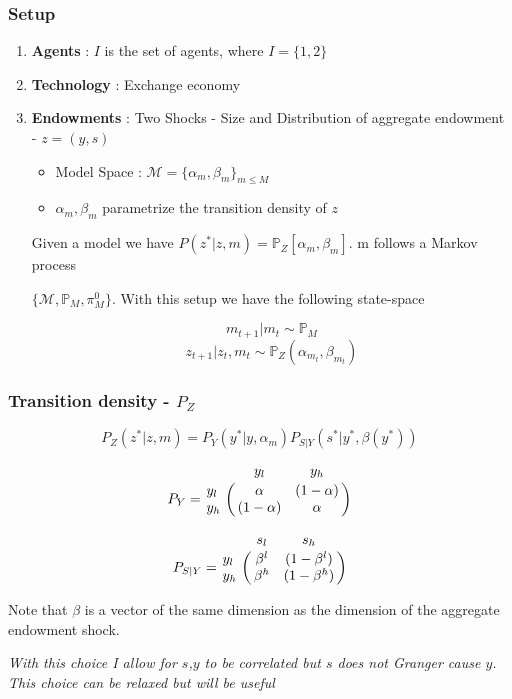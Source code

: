 \documentclass{beamer}
\theoremstyle{definition}
\begin{document}
\begin{frame}
\frametitle{Setup}
	\begin{enumerate}
		\item \textbf{Agents}  : $I$ is the  set of agents, where $I= \{1,2\}$
		\item \textbf{Technology} : Exchange economy

		\item \textbf{Endowments}  : Two Shocks - Size and
                  Distribution of aggregate endowment - $z=(y,s)$

\begin{itemize}
\item Model Space : $\mathcal{M}=\{\alpha_m,\beta_m\}_{m\leq M}$ 
\item $\alpha_m,\beta_m$ parametrize the transition density of $z$
\end{itemize}

Given a model we have $P(z^*|z,m)=\mathbb{P}_{Z}[\alpha_m,\beta_m]$. m follows a Markov process 

$\{\mathcal{M},\mathbb{P}_{M},\pi^0_{M}\}$. With this setup we have the following state-space

\[m_{t+1} | m_t \sim \mathbb{P}_{M}\]
\[z_{t+1}|z_t,m_t \sim \mathbb{P}_{Z}(\alpha_{m_t},\beta_{m_t})\]
 	\end{enumerate}
\end{frame}
\begin{frame}
\frametitle{Transition density  - $P_Z$}
\begin{equation}
\label{mat:Pz}
P_Z(z^*|z,m)=P_{Y} (y^*|y,\alpha_m)P_{S|Y} (s^*|y^*,\beta (y^*)) 
\end{equation}

\[P_Y=\bordermatrix{\text{} &y_l&y_h\cr
                y_l&\alpha  & (1-\alpha)\cr
                y_h&   (1-\alpha) &   \alpha}\]
                
\[P_{S|Y}=\bordermatrix{\text{}&s_l&s_h\cr
                y_l& \beta^l & (1-\beta^l)\cr
                y_h&   \beta^h & (1-\beta^h)}\]
                
Note that $\beta$ is a vector of the same dimension as the dimension of the aggregate endowment shock.
\vspace{2mm}

\small{\emph{With this choice I allow for $s$,$y$ to be correlated but $s$ does not \emph{Granger} cause $y$. This choice can be relaxed but will be useful}}

\end{frame}
\end{document}
